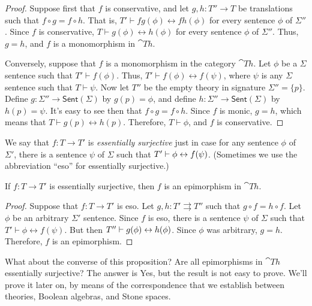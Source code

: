 \begin{proof} Suppose first that $f$ is conservative, and let
  $g,h:T''\to T$ be translations such that $f\circ g=f\circ h$.  That
  is, $T'\vdash fg(\phi )\leftrightarrow fh(\phi )$ for every sentence
  $\phi$ of $\Sigma ''$.  Since $f$ is conservative, $T\vdash g(\phi
  )\leftrightarrow h(\phi )$ for every sentence $\phi$ of $\Sigma ''$.
  Thus, $g=h$, and $f$ is a monomorphism in $\cat{Th}$.

  Conversely, suppose that $f$ is a monomorphism in the category
  $\cat{Th}$.  Let $\phi$ be a $\Sigma$ sentence such that $T'\vdash
  f(\phi )$.  Thus, $T'\vdash f(\phi )\leftrightarrow f(\psi )$, where
  $\psi$ is any $\Sigma$ sentence such that $T\vdash \psi$.  Now let
  $T''$ be the empty theory in signature $\Sigma ''=\{ p\}$.  Define
  $g:\Sigma ''\to \mathsf{Sent}(\Sigma )$ by $g(p)=\phi$, and define
  $h:\Sigma ''\to \mathsf{Sent}(\Sigma )$ by $h(p)=\psi$.  It's easy
  to see then that $f\circ g=f\circ h$.  Since $f$ is monic, $g=h$,
  which means that $T\vdash g(p)\leftrightarrow h(p)$.  Therefore,
  $T\vdash \phi$, and $f$ is conservative. \end{proof}

\begin{defn} We say that $f:T\to T'$ is \emph{essentially surjective}
  just in case for any sentence $\phi$ of $\Sigma '$, there is a
  sentence $\psi$ of $\Sigma$ such that $T'\vdash \phi\leftrightarrow f(\psi
  )$. (Sometimes we use the abbreviation ``eso'' for essentially
  surjective.)  \end{defn}

\begin{prop} If $f:T\to T'$ is essentially surjective, then $f$ is an
  epimorphism in $\cat{Th}$.  \end{prop}

\begin{proof} Suppose that $f:T\to T'$ is eso.  Let
  $g,h:T'\rightrightarrows T''$ such that $g\circ f=h\circ f$.  Let
  $\phi$ be an arbitrary $\Sigma '$ sentence.  Since $f$ is eso, there
  is a sentence $\psi$ of $\Sigma$ such that $T'\vdash
  \phi\leftrightarrow f(\psi )$.  But then $T''\vdash g(\phi )\leftrightarrow
  h(\phi )$.  Since $\phi$ was arbitrary, $g=h$.  Therefore, $f$ is an
  epimorphism.
\end{proof}

What about the converse of this proposition?  Are all epimorphisms in
$\cat{Th}$ essentially surjective?  The answer is Yes, but the result
is not easy to prove.  We'll prove it later on, by means of the
correspondence that we establish between theories, Boolean algebras,
and Stone spaces.


